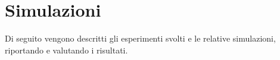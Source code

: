 \chapter{Simulazioni} \label{ch4:simulazioni}
Di seguito vengono descritti gli esperimenti svolti e le relative simulazioni, riportando e valutando i risultati.
